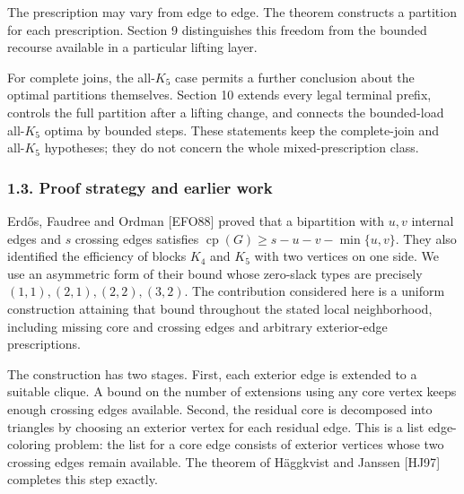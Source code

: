 \documentclass[english,11pt,a4paper]{article}
\begin{document}
The prescription may vary from edge to edge. The theorem constructs a
partition for each prescription. Section 9 distinguishes this freedom
from the bounded recourse available in a particular lifting layer.

For complete joins, the all-\(K_5\) case permits a further conclusion
about the optimal partitions themselves. Section 10 extends every legal
terminal prefix, controls the full partition after a lifting change, and
connects the bounded-load all-\(K_5\) optima by bounded steps. These
statements keep the complete-join and all-\(K_5\) hypotheses; they do
not concern the whole mixed-prescription class.

\subsubsection{1.3. Proof strategy and earlier
work}\label{proof-strategy-and-earlier-work}

Erdős, Faudree and Ordman {[}EFO88{]} proved that a bipartition with
\(u,v\) internal edges and \(s\) crossing edges satisfies
\(\operatorname{cp}(G)\ge s-u-v-\min\{u,v\}\). They also identified the
efficiency of blocks \(K_4\) and \(K_5\) with two vertices on one side.
We use an asymmetric form of their bound whose zero-slack types are
precisely \((1,1),(2,1),(2,2),(3,2)\). The contribution considered here
is a uniform construction attaining that bound throughout the stated
local neighborhood, including missing core and crossing edges and
arbitrary exterior-edge prescriptions.

The construction has two stages. First, each exterior edge is extended
to a suitable clique. A bound on the number of extensions using any core
vertex keeps enough crossing edges available. Second, the residual core
is decomposed into triangles by choosing an exterior vertex for each
residual edge. This is a list edge-coloring problem: the list for a core
edge consists of exterior vertices whose two crossing edges remain
available. The theorem of Häggkvist and Janssen {[}HJ97{]} completes
this step exactly.
\end{document}
